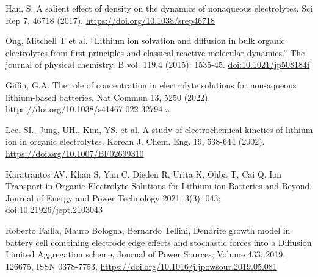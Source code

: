 \documentclass[12pt,a4paper]{article}
\begin{document}
	\begin{thebibliography}{99}
		 Han, S. A salient effect of density on the dynamics of nonaqueous electrolytes. Sci Rep 7, 46718 (2017). \href{https://doi.org/10.1038/srep46718}{https://doi.org/10.1038/srep46718}

		 Ong, Mitchell T et al. “Lithium ion solvation and diffusion in bulk organic electrolytes from first-principles and classical reactive molecular dynamics.” The journal of physical chemistry. B vol. 119,4 (2015): 1535-45. \href{https://doi.org/10.1021/jp508184f}{doi:10.1021/jp508184f}

		 Giffin, G.A. The role of concentration in electrolyte solutions for non-aqueous lithium-based batteries. Nat Commun 13, 5250 (2022). \href{https://doi.org/10.1038/s41467-022-32794-z}{https://doi.org/10.1038/s41467-022-32794-z}

		 Lee, SI., Jung, UH., Kim, YS. et al. A study of electrochemical kinetics of lithium ion in organic electrolytes. Korean J. Chem. Eng. 19, 638-644 (2002). \href{https://doi.org/10.1007/BF02699310}{https://doi.org/10.1007/BF02699310}

		 Karatrantos AV, Khan S, Yan C, Dieden R, Urita K, Ohba T, Cai Q. Ion Transport in Organic Electrolyte Solutions for Lithium-ion Batteries and Beyond. Journal of Energy and Power Technology 2021; 3(3): 043; \href{https://doi.org/10.21926/jept.2103043}{doi:10.21926/jept.2103043}

		 Roberto Failla, Mauro Bologna, Bernardo Tellini, Dendrite growth model in battery cell combining electrode edge effects and stochastic forces into a Diffusion Limited Aggregation scheme, Journal of Power Sources, Volume 433, 2019, 126675, ISSN 0378-7753, \href{https://doi.org/10.1016/j.jpowsour.2019.05.081}{https://doi.org/10.1016/j.jpowsour.2019.05.081}
	\end{thebibliography}
\end{document}
